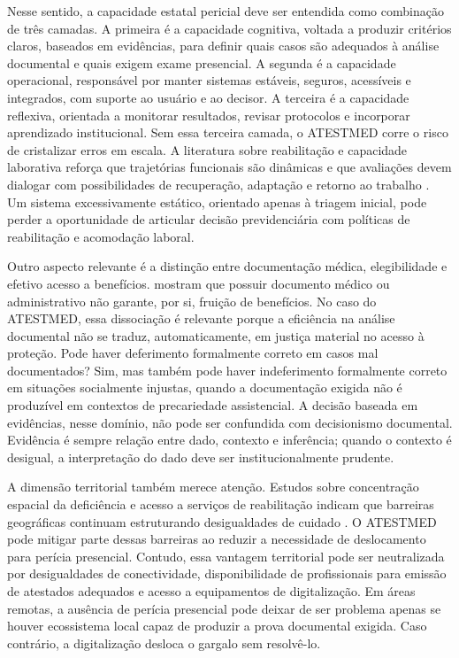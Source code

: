\documentclass[12pt,a4paper]{article}
\begin{document}
Nesse sentido, a capacidade estatal pericial deve ser entendida como combinação de três camadas. A primeira é a capacidade cognitiva, voltada a produzir critérios claros, baseados em evidências, para definir quais casos são adequados à análise documental e quais exigem exame presencial. A segunda é a capacidade operacional, responsável por manter sistemas estáveis, seguros, acessíveis e integrados, com suporte ao usuário e ao decisor. A terceira é a capacidade reflexiva, orientada a monitorar resultados, revisar protocolos e incorporar aprendizado institucional. Sem essa terceira camada, o ATESTMED corre o risco de cristalizar erros em escala. A literatura sobre reabilitação e capacidade laborativa reforça que trajetórias funcionais são dinâmicas e que avaliações devem dialogar com possibilidades de recuperação, adaptação e retorno ao trabalho \parencite{przysada2019anassessmentofworkabilityafterthecompletionofre,deveau2011workplaceaccommodationandauditbasedevaluationprocess}. Um sistema excessivamente estático, orientado apenas à triagem inicial, pode perder a oportunidade de articular decisão previdenciária com políticas de reabilitação e acomodação laboral.

Outro aspecto relevante é a distinção entre documentação médica, elegibilidade e efetivo acesso a benefícios. \textcite{rajasulochana2026doeshavingadisabilitycertificateensurebenefit} mostram que possuir documento médico ou administrativo não garante, por si, fruição de benefícios. No caso do ATESTMED, essa dissociação é relevante porque a eficiência na análise documental não se traduz, automaticamente, em justiça material no acesso à proteção. Pode haver deferimento formalmente correto em casos mal documentados? Sim, mas também pode haver indeferimento formalmente correto em situações socialmente injustas, quando a documentação exigida não é produzível em contextos de precariedade assistencial. A decisão baseada em evidências, nesse domínio, não pode ser confundida com decisionismo documental. Evidência é sempre relação entre dado, contexto e inferência; quando o contexto é desigual, a interpretação do dado deve ser institucionalmente prudente.

A dimensão territorial também merece atenção. Estudos sobre concentração espacial da deficiência e acesso a serviços de reabilitação indicam que barreiras geográficas continuam estruturando desigualdades de cuidado \parencite{gao2019disabilityconcentrationandaccesstorehabilitationservice}. O ATESTMED pode mitigar parte dessas barreiras ao reduzir a necessidade de deslocamento para perícia presencial. Contudo, essa vantagem territorial pode ser neutralizada por desigualdades de conectividade, disponibilidade de profissionais para emissão de atestados adequados e acesso a equipamentos de digitalização. Em áreas remotas, a ausência de perícia presencial pode deixar de ser problema apenas se houver ecossistema local capaz de produzir a prova documental exigida. Caso contrário, a digitalização desloca o gargalo sem resolvê-lo.
\end{document}
